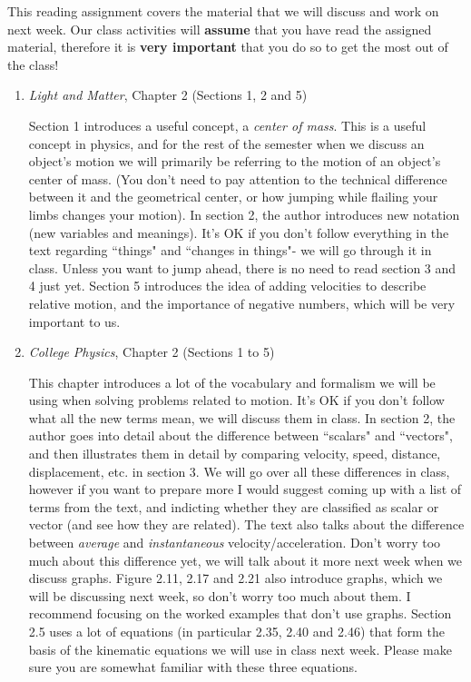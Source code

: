 \documentclass[addpoints,12pt]{exam}
\begin{document}
This reading assignment covers the material that we will discuss and work on next week. Our class activities will \textbf{assume} that you have read the assigned material, therefore it is \textbf{very important} that you do so to get the most out of the class!
\begin{enumerate}
	\item \textit{Light and Matter}, Chapter 2 (Sections 1, 2 and 5)
	
	Section 1 introduces a useful concept, a \textit{center of mass}. This is a useful concept in physics, and for the rest of the semester when we discuss an object's motion we will primarily be referring to the motion of an object's center of mass. (You don't need to pay attention to the technical difference between it and the geometrical center, or how jumping while flailing your limbs changes your motion). In section 2, the author introduces new notation (new variables and meanings). It's OK if you don't follow everything in the text regarding ``things" and ``changes in things"- we will go through it in class. Unless you want to jump ahead, there is no need to read section 3 and 4 just yet. Section 5 introduces the idea of adding velocities to describe relative motion, and the importance of negative numbers, which will be very important to us.
	
	\item \textit{College Physics}, Chapter 2 (Sections 1 to 5)

	This chapter introduces a lot of the vocabulary and formalism we will be using when solving problems related to motion. It's OK if you don't follow what all the new terms mean, we will discuss them in class. In section 2, the author goes into detail about the difference between ``scalars" and ``vectors", and then illustrates them in detail by comparing velocity, speed, distance, displacement, etc. in section 3. We will go over all these differences in class, however if you want to prepare more I would suggest coming up with a list of terms from the text, and indicting whether they are classified as scalar or vector (and see how they are related). The text also talks about the difference between \textit{average} and \textit{instantaneous} velocity/acceleration. Don't worry too much about this difference yet, we will talk about it more next week when we discuss graphs.
	Figure 2.11, 2.17 and 2.21 also introduce graphs, which we will be discussing next week, so don't worry too much about them. I recommend focusing on the worked examples that don't use graphs.
	Section 2.5 uses a lot of equations (in particular 2.35, 2.40 and 2.46) that form the basis of the kinematic equations we will use in class next week. Please make sure you are somewhat familiar with these three equations.
	

\end{enumerate}
\end{document}
